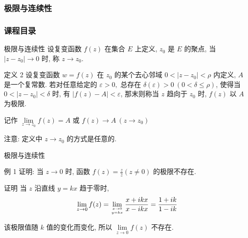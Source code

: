 \documentclass{beamer}
\begin{document}
\subsubsection{极限与连续性}

\begin{frame}
\frametitle{课程目录}
\tableofcontents[currentsubsection ] %
\end{frame}


\begin{frame}{极限与连续性}
设复变函数 $ f(z) $ 在集合 $ E $ 上定义, $ z_0 $ 是 $ E $ 的聚点, 当 $ |z - z_0|\to 0 $ 时, 称 $ z \to z_0 $. 

\begin{block}{定义 2}
设复变函数 $ w = f(z) $ 在 $ {z_0} $ 的某个去心邻域 $ 0 < \left| {z - {z_0}} \right| < \rho $ 内定义,  $ A $ 是一个复常数. 若对任意给定的 $ \varepsilon > 0,  $ 总存在 $ \delta (\varepsilon ) > 0~(0 < \delta \le \rho ) $,  使得当 $ 0 < \left| {z - {z_0}} \right| < \delta $ 时, 有 $ \left| {f(z) - A} \right| < \varepsilon $,  那末则称当 $ z $ 趋向于 $ {z_0} $ 时, $ f(z) $ 以 $ A $ 为极限.

记作 $ \lim \limits_{z \to {z_0}} f(z) = A $ 或 $ f(z) \to A~(z \to {z_0}) $ 
\end{block}


注意: 定义中 $ z \to {z_0} $ 的方式是任意的.
\end{frame}
\begin{frame}{极限与连续性}
\begin{block}{例 1}
证明: 当 $ z \to 0 $ 时, 函数 $ f(z) = \frac{z}{{\bar z}} (z \ne 0) $ 的极限不存在.
\end{block}

\begin{block}{证明}
当 $ z $ 沿直线 $ y = kx $ 趋于零时, 
\[\lim \limits_{z \to 0} f(z) = \lim \limits_{x\to 0 \atop 	y= kx} \frac{{x + ikx}}{{x - ikx}} = \frac{{1 + ik}}{{1 - ik}}\]

该极限值随 $ k $ 值的变化而变化, 所以 $ \lim \limits_{z \to 0} f(z) $ 不存在.
\end{block}



\end{frame}
\end{document}
